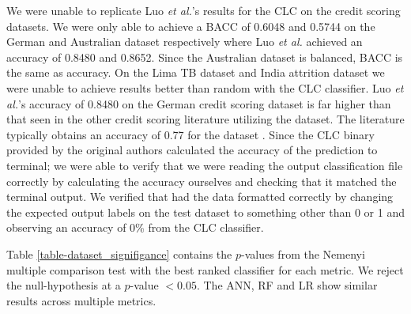 \documentclass{sig-alternate-05-2015}
\begin{document}
	We were unable to replicate Luo \textit{et al.}'s \cite{Luo20097562} results for the CLC on the credit scoring datasets. We were only able to achieve a BACC of 0.6048 and 0.5744 on the German and Australian dataset respectively where Luo \textit{et al.} achieved an accuracy of 0.8480 and 0.8652. Since the Australian dataset is balanced, BACC is the same as accuracy. On the Lima TB dataset and India attrition dataset we were unable to achieve results better than random with the CLC classifier. Luo \textit{et al.}'s accuracy of 0.8480 on the German credit scoring dataset is far higher than that seen in the other credit scoring literature utilizing the dataset. The literature typically obtains an accuracy of 0.77 for the dataset \cite{Huang2007847, Nanni20093028, Tsai20082639, Wang2011223}. Since the CLC binary provided by the original authors \cite{Chen2006}	calculated the accuracy of the prediction to terminal; we were able to verify that we were reading the output classification file correctly by calculating the accuracy ourselves and checking that it matched the terminal output. We verified that had the data formatted correctly by changing the expected output labels on the test dataset to something other than 0 or 1 and observing an accuracy of 0\% from the CLC classifier. 
	
	Table \ref{table-dataset_signifigance} contains the $p$-values from the Nemenyi multiple comparison test with the best ranked classifier for each metric. We reject the null-hypothesis at a $p$-value $< 0.05$. The ANN, RF and LR show similar results across multiple metrics.	
	
	
\end{document}
